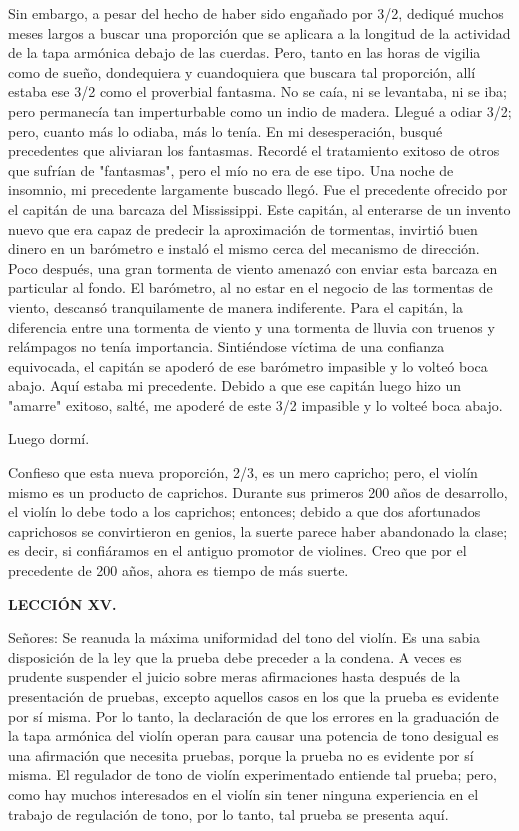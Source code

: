 \documentclass[12pt]{book}
\begin{document}
Sin embargo, a pesar del hecho de haber sido engañado por 3/2, dediqué muchos meses largos a buscar una proporción que se aplicara a la longitud de la actividad de la tapa armónica debajo de las cuerdas. Pero, tanto en las horas de vigilia como de sueño, dondequiera y cuandoquiera que buscara tal proporción, allí estaba ese 3/2 como el proverbial fantasma. No se caía, ni se levantaba, ni se iba; pero permanecía tan imperturbable como un indio de madera. Llegué a odiar 3/2; pero, cuanto más lo odiaba, más lo tenía. En mi desesperación, busqué precedentes que aliviaran los fantasmas. Recordé el tratamiento exitoso de otros que sufrían de "fantasmas", pero el mío no era de ese tipo. Una noche de insomnio, mi precedente largamente buscado llegó. Fue el precedente ofrecido por el capitán de una barcaza del Mississippi. Este capitán, al enterarse de un invento nuevo que era capaz de predecir la aproximación de tormentas, invirtió buen dinero en un barómetro e instaló el mismo cerca del mecanismo de dirección. Poco después, una gran tormenta de viento amenazó con enviar esta barcaza en particular al fondo. El barómetro, al no estar en el negocio de las tormentas de viento, descansó tranquilamente de manera indiferente. Para el capitán, la diferencia entre una tormenta de viento y una tormenta de lluvia con truenos y relámpagos no tenía importancia. Sintiéndose víctima de una confianza equivocada, el capitán se apoderó de ese barómetro impasible y lo volteó boca abajo. Aquí estaba mi precedente. Debido a que ese capitán luego hizo un "amarre" exitoso, salté, me apoderé de este 3/2 impasible y lo volteé boca abajo.

Luego dormí.

Confieso que esta nueva proporción, 2/3, es un mero capricho; pero, el violín mismo es un producto de caprichos. Durante sus primeros 200 años de desarrollo, el violín lo debe todo a los caprichos; entonces; debido a que dos afortunados caprichosos se convirtieron en genios, la suerte parece haber abandonado la clase; es decir, si confiáramos en el antiguo promotor de violines. Creo que por el precedente de 200 años, ahora es tiempo de más suerte.

\textbf{LECCIÓN XV.}

Señores: Se reanuda la máxima uniformidad del tono del violín. Es una sabia disposición de la ley que la prueba debe preceder a la condena. A veces es prudente suspender el juicio sobre meras afirmaciones hasta después de la presentación de pruebas, excepto aquellos casos en los que la prueba es evidente por sí misma. Por lo tanto, la declaración de que los errores en la graduación de la tapa armónica del violín operan para causar una potencia de tono desigual es una afirmación que necesita pruebas, porque la prueba no es evidente por sí misma. El regulador de tono de violín experimentado entiende tal prueba; pero, como hay muchos interesados en el violín sin tener ninguna experiencia en el trabajo de regulación de tono, por lo tanto, tal prueba se presenta aquí.
\end{document}
